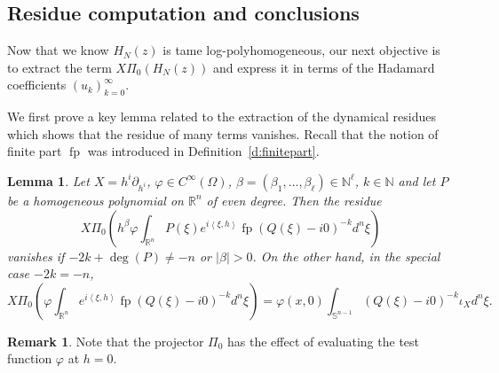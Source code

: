 \documentclass[JEP,XML,SOM,Unicode]{cedram}
\newtheorem{lemma}[theorem]{Lemma}
\theoremstyle{definition}
\newtheorem{remark}[theorem]{Remark}
\newcommand\nn{{\mathbb N}}
\let\euler X
\DeclareMathOperator*{\pf}{fp}
\begin{document}
\subsection{Residue computation and conclusions} \label{ss:rcc} Now that we know $H_N(z)$ is tame log-polyhomogeneous, our next objective is to extract the term
$\euler \Pi_0(H_N(z))$ and express it in terms of the Hadamard coefficients $(u_k)_{k=0}^\infty$.

We first prove a key lemma related to the extraction of the dynamical residues which shows that the residue of many terms vanishes. Recall that the notion of finite part $\pf$ was introduced in Definition~\ref{d:finitepart}.

\begin{lemma}\label{l:vanishlemma2}
Let $\euler=h^i\partial_{h^i}$, $\varphi\in C^\infty(\Omega)$, $\beta=(\beta_1,\dots,\beta_\ell)\in \nn^\ell$, $k\in \mathbb{N}$ and let $P$ be a homogeneous polynomial on $\mathbb{R}^n$ of even
degree.
Then the residue
\[
\euler \Pi_0\left(h^\beta \varphi\int_{\mathbb{R}^n}P(\xi) e^{i\left\langle\xi,h\right\rangle}\pf(Q(\xi)-i0)^{-k}d^n\xi \right)
\]
vanishes if $-2k+\deg(P)\neq -n$ or $\vert \beta\vert>0$. On the other hand, in the special case $-2k=-n$,
\[
\euler \Pi_0\left(\varphi \int_{\mathbb{R}^n} e^{i\left\langle\xi,h\right\rangle}\pf(Q(\xi)-i0)^{-k} d^n\xi\right)=\varphi(x,0)\int_{\mathbb{S}^{n-1}}
(Q(\xi)-i0)^{-k} \iota_\euler d^n\xi.
\]
\end{lemma}
\begin{remark}\label{rem:evalat0}
Note that the projector $\Pi_0$ has the effect of evaluating the test function
$\varphi$ at $h=0$.
\end{remark}
\end{document}
